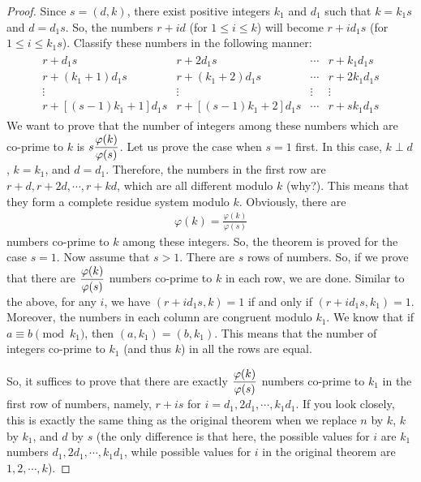 \documentclass[12pt]{subfile}
\begin{document}
\begin{proof}
			Since $s=(d,k)$, there exist positive integers $k_1$ and $d_1$ such that $k = k_1s$ and $d = d_1s$. So, the numbers $r+id$ (for $1 \leq  i \leq k$) will become $r+id_1s$ (for $1 \leq i \leq k_1s$). Classify these numbers in the following manner:
				\begin{align*}
					 \begin{matrix}
						 r+d_1s&r+2d_1s&\cdots&r+k_1d_1s\\
						 r+(k_1+1)d_1s&r+(k_1+2)d_1s&\cdots&r+2k_1d_1s\\
						 \vdots&\vdots&\vdots&\vdots\\
						 r+[(s-1)k_1+1]d_1s&r+[(s-1)k_1+2]d_1s&\cdots&r+sk_1d_1s
					 \end{matrix}
				\end{align*}
			We want to prove that the number of integers among these numbers which are co-prime to $k$ is $s \dfrac{\varphi(k)}{\varphi(s)}$. Let us prove the case when $s=1$ first. In this case, $k \perp d$, $k=k_1$, and $d=d_1$. Therefore, the numbers in the first row are $r+d, r+2d, \cdots, r+kd$, which are all different modulo $k$ (why?). This means that they form a complete residue system modulo $k$. Obviously, there are 
				\begin{align*}
					\varphi(k) = \frac{\varphi(k)}{\varphi(s)}
				\end{align*}
			numbers co-prime to $k$ among these integers. So, the theorem is proved for the case $s=1$.
			Now assume that $s>1$. There are $s$ rows of numbers. So, if we prove that there are $\dfrac{\varphi(k)}{\varphi(s)}$ numbers co-prime to $k$ in each row, we are done. Similar to the above, for any $i$, we have $(r+id_1s, k)=1$ if and only if $(r+id_1s, k_1)=1$. Moreover, the numbers in each column are congruent modulo $k_1$. We know that if $a \equiv b \pmod{k_1}$, then $(a, k_1) = (b, k_1)$. This means that the number of integers co-prime to $k_1$ (and thus $k$) in all the rows are equal. 
			
			So, it suffices to prove that there are exactly $\dfrac{\varphi(k)}{\varphi(s)}$ numbers co-prime to $k_1$ in the first row of numbers, namely, $r+is$ for $i=d_1,2d_1,\cdots,k_1d_1$. If you look closely, this is exactly the same thing as the original theorem when we replace $n$ by $k$, $k$ by $k_1$, and $d$ by $s$ (the only difference is that here, the possible values for $i$ are $k_1$ numbers $d_1,2d_1,\cdots,k_1d_1$, while possible values for $i$ in the original theorem are $1,2,\cdots,k$). 
			

\end{proof}
\end{document}
